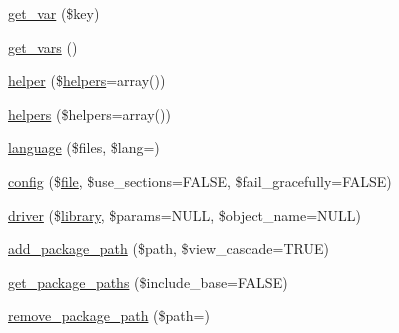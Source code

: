 \begin{DoxyCompactItemize}
\item 
\mbox{\hyperlink{class_c_i___loader_a06567b423ba6d5b852808e581ef00fb0}{get\+\_\+var}} (\$key)
\item 
\mbox{\hyperlink{class_c_i___loader_aff8505856d4aa461fcb3c0207d6a238f}{get\+\_\+vars}} ()
\item 
\mbox{\hyperlink{class_c_i___loader_a2da00ff269596262b62c0c6032b2996f}{helper}} (\$\mbox{\hyperlink{class_c_i___loader_a2c39d50f31ce66ffe936e4f68219e275}{helpers}}=array())
\item 
\mbox{\hyperlink{class_c_i___loader_a2c39d50f31ce66ffe936e4f68219e275}{helpers}} (\$helpers=array())
\item 
\mbox{\hyperlink{class_c_i___loader_ae3e44c33f5f085ad8d6c556ede1385d8}{language}} (\$files, \$lang=\textquotesingle{}\textquotesingle{})
\item 
\mbox{\hyperlink{class_c_i___loader_af54799dcb5bf2f7346b5d2a7d824a471}{config}} (\$\mbox{\hyperlink{class_c_i___loader_a47e4b8eda2bbf9e8bb505cdafb8e4ba5}{file}}, \$use\+\_\+sections=F\+A\+L\+SE, \$fail\+\_\+gracefully=F\+A\+L\+SE)
\item 
\mbox{\hyperlink{class_c_i___loader_ad7ea86a4ca078b6419c7d04827db700b}{driver}} (\$\mbox{\hyperlink{class_c_i___loader_a03207e0bcf58b6c9ecbc09fd2d8eab5d}{library}}, \$params=N\+U\+LL, \$object\+\_\+name=N\+U\+LL)
\item 
\mbox{\hyperlink{class_c_i___loader_a8b23f3be0a84aa31df8b715ca841f5cf}{add\+\_\+package\+\_\+path}} (\$path, \$view\+\_\+cascade=T\+R\+UE)
\item 
\mbox{\hyperlink{class_c_i___loader_a645d5b65ec991d936d864e8af01485e7}{get\+\_\+package\+\_\+paths}} (\$include\+\_\+base=F\+A\+L\+SE)
\item 
\mbox{\hyperlink{class_c_i___loader_a12a6fab391d5b0a90976197c82f6dc07}{remove\+\_\+package\+\_\+path}} (\$path=\textquotesingle{}\textquotesingle{})
\end{DoxyCompactItemize}
